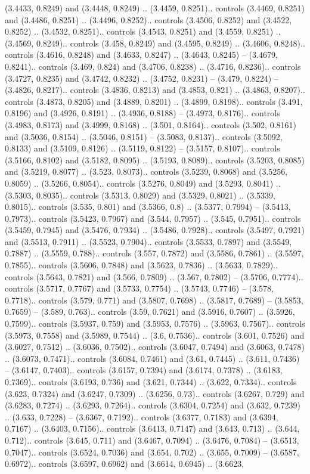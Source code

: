 (3.4433, 0.8249) and (3.4448, 0.8249) .. (3.4459, 0.8251).. controls (3.4469, 0.8251) and (3.4486, 0.8251) .. (3.4496, 0.8252).. controls (3.4506, 0.8252) and (3.4522, 0.8252) .. (3.4532, 0.8251).. controls (3.4543, 0.8251) and (3.4559, 0.8251) .. (3.4569, 0.8249).. controls (3.458, 0.8249) and (3.4595, 0.8249) .. (3.4606, 0.8248).. controls (3.4616, 0.8248) and (3.4633, 0.8247) .. (3.4643, 0.8245) -- (3.4679, 0.8241).. controls (3.469, 0.824) and (3.4706, 0.8238) .. (3.4716, 0.8236).. controls (3.4727, 0.8235) and (3.4742, 0.8232) .. (3.4752, 0.8231) -- (3.479, 0.8224) -- (3.4826, 0.8217).. controls (3.4836, 0.8213) and (3.4853, 0.821) .. (3.4863, 0.8207).. controls (3.4873, 0.8205) and (3.4889, 0.8201) .. (3.4899, 0.8198).. controls (3.491, 0.8196) and (3.4926, 0.8191) .. (3.4936, 0.8188) -- (3.4973, 0.8176).. controls (3.4983, 0.8173) and (3.4999, 0.8168) .. (3.501, 0.8164).. controls (3.502, 0.8161) and (3.5036, 0.8154) .. (3.5046, 0.8151) -- (3.5083, 0.8137).. controls (3.5092, 0.8133) and (3.5109, 0.8126) .. (3.5119, 0.8122) -- (3.5157, 0.8107).. controls (3.5166, 0.8102) and (3.5182, 0.8095) .. (3.5193, 0.8089).. controls (3.5203, 0.8085) and (3.5219, 0.8077) .. (3.523, 0.8073).. controls (3.5239, 0.8068) and (3.5256, 0.8059) .. (3.5266, 0.8054).. controls (3.5276, 0.8049) and (3.5293, 0.8041) .. (3.5303, 0.8035).. controls (3.5313, 0.8029) and (3.5329, 0.8021) .. (3.5339, 0.8015).. controls (3.535, 0.801) and (3.5366, 0.8) .. (3.5377, 0.7994) -- (3.5413, 0.7973).. controls (3.5423, 0.7967) and (3.544, 0.7957) .. (3.545, 0.7951).. controls (3.5459, 0.7945) and (3.5476, 0.7934) .. (3.5486, 0.7928).. controls (3.5497, 0.7921) and (3.5513, 0.7911) .. (3.5523, 0.7904).. controls (3.5533, 0.7897) and (3.5549, 0.7887) .. (3.5559, 0.788).. controls (3.557, 0.7872) and (3.5586, 0.7861) .. (3.5597, 0.7855).. controls (3.5606, 0.7848) and (3.5623, 0.7836) .. (3.5633, 0.7829).. controls (3.5643, 0.7821) and (3.566, 0.7809) .. (3.567, 0.7802) -- (3.5706, 0.7774).. controls (3.5717, 0.7767) and (3.5733, 0.7754) .. (3.5743, 0.7746) -- (3.578, 0.7718).. controls (3.579, 0.771) and (3.5807, 0.7698) .. (3.5817, 0.7689) -- (3.5853, 0.7659) -- (3.589, 0.763).. controls (3.59, 0.7621) and (3.5916, 0.7607) .. (3.5926, 0.7599).. controls (3.5937, 0.759) and (3.5953, 0.7576) .. (3.5963, 0.7567).. controls (3.5973, 0.7558) and (3.5989, 0.7544) .. (3.6, 0.7536).. controls (3.601, 0.7526) and (3.6027, 0.7512) .. (3.6036, 0.7502).. controls (3.6047, 0.7494) and (3.6063, 0.7478) .. (3.6073, 0.7471).. controls (3.6084, 0.7461) and (3.61, 0.7445) .. (3.611, 0.7436) -- (3.6147, 0.7403).. controls (3.6157, 0.7394) and (3.6174, 0.7378) .. (3.6183, 0.7369).. controls (3.6193, 0.736) and (3.621, 0.7344) .. (3.622, 0.7334).. controls (3.623, 0.7324) and (3.6247, 0.7309) .. (3.6256, 0.73).. controls (3.6267, 0.729) and (3.6283, 0.7274) .. (3.6293, 0.7264).. controls (3.6304, 0.7254) and (3.632, 0.7239) .. (3.633, 0.7228) -- (3.6367, 0.7192).. controls (3.6377, 0.7183) and (3.6394, 0.7167) .. (3.6403, 0.7156).. controls (3.6413, 0.7147) and (3.643, 0.713) .. (3.644, 0.712).. controls (3.645, 0.711) and (3.6467, 0.7094) .. (3.6476, 0.7084) -- (3.6513, 0.7047).. controls (3.6524, 0.7036) and (3.654, 0.702) .. (3.655, 0.7009) -- (3.6587, 0.6972).. controls (3.6597, 0.6962) and (3.6614, 0.6945) .. (3.6623, 